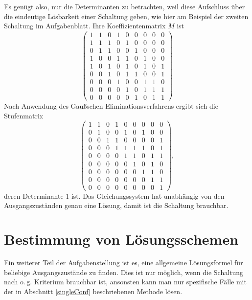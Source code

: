 \documentclass{scrartcl}
\begin{document}
Es genügt also, nur die Determinanten zu betrachten, weil diese Aufschluss über
die eindeutige Lösbarkeit einer Schaltung geben, wie hier am Beispiel der
zweiten Schaltung im Aufgabenblatt. Ihre Koeffizientenmatrix $M$ ist
\begin{equation}
\begin{pmatrix}
  1&1&0&1&0&0&0&0&0\\
  1&1&1&0&1&0&0&0&0\\
  0&1&1&0&0&1&0&0&0\\
  1&0&0&1&1&0&1&0&0\\
  1&0&1&0&1&0&1&0&1\\
  0&0&1&0&1&1&0&0&1\\
  0&0&0&1&0&0&1&1&0\\
  0&0&0&0&1&0&1&1&1\\
  0&0&0&0&0&1&0&1&1
\end{pmatrix}\label{m9}
\end{equation}
Nach Anwendung des Gaußschen Eliminationsverfahrens ergibt sich die
Stufenmatrix
\begin{equation}
\begin{pmatrix}
  1&1&0&1&0&0&0&0&0\\
  0&1&0&0&1&0&1&0&0\\
  0&0&1&1&0&0&0&0&1\\
  0&0&0&1&1&1&1&0&1\\
  0&0&0&0&1&1&0&1&1\\
  0&0&0&0&0&1&0&1&0\\
  0&0&0&0&0&0&1&1&0\\
  0&0&0&0&0&0&0&1&1\\
  0&0&0&0&0&0&0&0&1
\end{pmatrix},
\end{equation}
deren Determinante $1$ ist. Das Gleichungssystem hat unabhängig von den
Ausgangszuständen genau eine Lösung, damit ist die Schaltung brauchbar.

\section{Bestimmung von Lösungsschemen}
Ein weiterer Teil der Aufgabenstellung ist es, eine allgemeine Lösungsformel
für beliebige Ausgangszustände zu finden. Dies ist nur möglich, wenn die
Schaltung nach o.\,g. Kriterium brauchbar ist, ansonsten kann man nur
spezifische Fälle mit der in Abschnitt \ref{singleConf} beschriebenen Methode
lösen.
\end{document}
